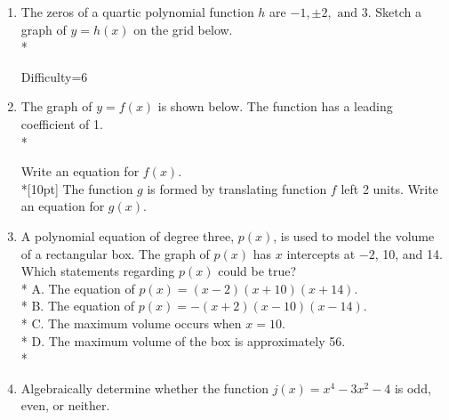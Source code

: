 \documentclass[12pt, oneside]{article}
\begin{document}
\begin{enumerate}
\item The zeros of a quartic polynomial function $h$ are  $-1,\pm 2, \text{ and } 3$. Sketch a graph of $y = h(x)$ on the grid below.\\*
\begin{center}
\end{center}
\newpage
Difficulty=6
\item The graph of $y = f(x)$ is shown below. The function has a leading coefficient of 1.\\*
\begin{center}
\end{center}
Write an equation for $f(x)$.\\*[10pt]
The function $g$ is formed by translating function $f$ left 2 units. Write an equation for $g(x)$.

\item A polynomial equation of degree three, $p(x)$, is used to model the volume of a rectangular box. The graph of $p(x)$ has $x$ intercepts at  $-2$, 10, and 14. Which statements regarding $p(x)$ could be true?\\*
A. The equation of $p(x) = (x - 2)(x + 10)(x +14)$.\\*
B. The equation of $p(x) = -(x + 2)(x - 10)(x - 14)$.\\*
C. The maximum volume occurs when $x = 10$.\\*
D. The maximum volume of the box is approximately 56.\\* %

\item Algebraically determine whether the function $j(x) = x^4- 3x^2- 4$ is odd, even, or neither. %


\end{enumerate}
\end{document}
